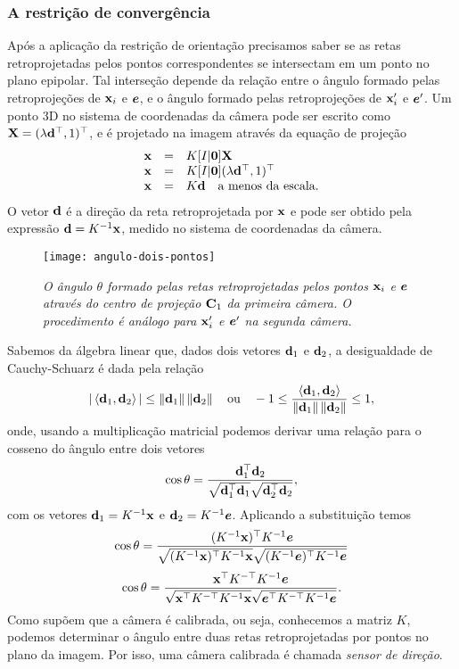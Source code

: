 \subsubsection{A restrição de convergência}
Após a aplicação da restrição de orientação precisamos saber se as retas retroprojetadas pelos pontos correspondentes se intersectam em um ponto no plano epipolar. Tal interseção depende da relação entre o ângulo formado pelas retroprojeções de $\mathbf{x}_i$ e $\boldsymbol{e}$, e o ângulo formado pelas retroprojeções de $\mathbf{x}'_i$ e $\boldsymbol{e}'$. Um ponto 3D no sistema de coordenadas da câmera pode ser escrito como $\mathbf{X}=(\lambda {\bf d}^\top,1)^\top$, e é projetado na imagem através da equação de projeção
\begin{equation*}
\begin{array}{rcl}
\mathbf{x}&=&K[I|{\bf 0}]\mathbf{X}\\
\mathbf{x}&=&K[I|{\bf 0}](\lambda {\bf d}^\top,1)^\top\\
\mathbf{x}&=&K{\bf d}\quad\text{a menos da escala.}
\end{array}
\end{equation*}
O vetor ${\bf d}$ é a direção da reta retroprojetada por $\mathbf{x}$ e pode ser obtido pela expressão ${\bf d}=K^{-1}\mathbf{x}$, medido no sistema de coordenadas da câmera.
\begin{figure}[!htb]
\centering
\texttt{[image: angulo-dois-pontos]}
\caption{{\it O ângulo $\theta$ formado pelas retas retroprojetadas pelos pontos $\mathbf{x}_i$ e $\boldsymbol{e}$ através do centro de projeção ${\bf C}_1$ da primeira câmera. O procedimento é análogo para $\mathbf{x}'_i$ e $\boldsymbol{e}'$ na segunda câmera.}}
\end{figure}
Sabemos da álgebra linear que, dados dois vetores ${\bf d}_1$ e ${\bf d}_2$, a desigualdade de Cauchy-Schuarz é dada pela relação 
\begin{equation*}
|\left\langle{\bf d}_1,{\bf d}_2\right\rangle|\leq\left\|{\bf d}_1\right\|\left\|{\bf d}_2\right\|\quad\text{ou}\quad -1\leq\frac{\left\langle{\bf d}_1,{\bf d}_2\right\rangle}{\left\|{\bf d}_1\right\|\left\|{\bf d}_2\right\|}\leq 1,
\end{equation*}
onde, usando a multiplicação matricial podemos derivar uma relação para o cosseno do ângulo entre dois vetores
\begin{equation*}
\cos\theta=\frac{{\bf d}_1^\top{\bf d}_2}{\sqrt{{\bf d}_1^\top{\bf d}_1}\sqrt{{\bf d}_2^\top{\bf d}_2}},
\end{equation*}
com os vetores ${\bf d}_1=K^{-1}\mathbf{x}$ e ${\bf d}_2=K^{-1}\boldsymbol{e}$. Aplicando a substituição temos
\begin{equation*}
\cos\theta=\frac{(K^{-1}\mathbf{x})^\top K^{-1}\boldsymbol{e}}{\sqrt{(K^{-1}\mathbf{x})^\top K^{-1}\mathbf{x}}\sqrt{(K^{-1}\boldsymbol{e})^\top K^{-1}\boldsymbol{e}}}
\end{equation*}
\begin{equation}\label{eq.cos-theta}
\cos\theta=\frac{\mathbf{x}^\top K^{-\top} K^{-1}\boldsymbol{e}}{\sqrt{\mathbf{x}^\top K^{-\top} K^{-1}\mathbf{x}}\sqrt{\boldsymbol{e}^\top K^{-\top} K^{-1}\boldsymbol{e}}}.
\end{equation}
Como \citep{2503343} supõem que a câmera é calibrada, ou seja, conhecemos a matriz $K$, podemos determinar o ângulo entre duas retas retroprojetadas por pontos no plano da imagem. Por isso, uma câmera calibrada é chamada {\it sensor de direção}.

